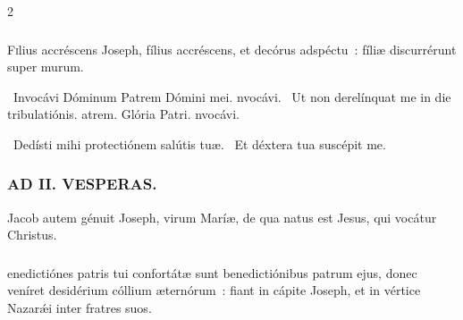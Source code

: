 \documentclass[9pt,twoside]{extarticle}
\begin{document}
\begin{multicols}{2}
{{{\subsubsection*{}
\lettrine{F}ilius accréscens Joseph, fílius accréscens, et decórus adspéctu~: fíliæ discurrérunt super murum.

\begin{tightlist}{}
\item {}~Invocávi Dóminum \textred{*} Patrem Dómini mei. nvocávi. ~Ut non derelínquat me in die tribulatiónis. atrem. Glória Patri. nvocávi.
\item {}~Dedísti mihi protectiónem salútis tuæ. ~Et déxtera tua suscépit me.
\end{tightlist}

\subsubsection*{\center \textsc{AD II. VESPERAS.}}
\begin{tightlist}{}
\item {} Jacob autem génuit Joseph, virum Maríæ, de qua natus est Jesus, qui vocátur Christus. 
\item {}
\end{tightlist}

\subsubsection*{}
enedictiónes patris tui confortátæ sunt benedictiónibus patrum ejus, donec veníret desidérium cóllium æternórum~: fiant in cápite Joseph, et in vértice Nazarǽi inter fratres suos.

}}}
\end{multicols}
\end{document}
